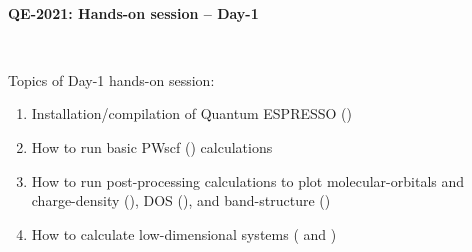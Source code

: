 \documentclass[landscape]{foils}
\begin{document}

\blue
~\\
\vspace*{4cm}
\MyLogo{~}
\vspace{5em}
\begin{center}
  \centerline{\red\LARGE\bf QE-2021: Hands-on session -- Day-1}
  ~\\[1.5em]  
\end{center}

Topics of Day-1 hands-on session:
\begin{enumerate}
\item Installation/compilation of Quantum ESPRESSO ()
\item How to run basic PWscf () calculations
\item How to run post-processing calculations to plot
  molecular-orbitals and charge-density (), DOS
  (), and band-structure ()
\item How to calculate low-dimensional systems ( and
  )
\end{enumerate}
    
\end{document}
